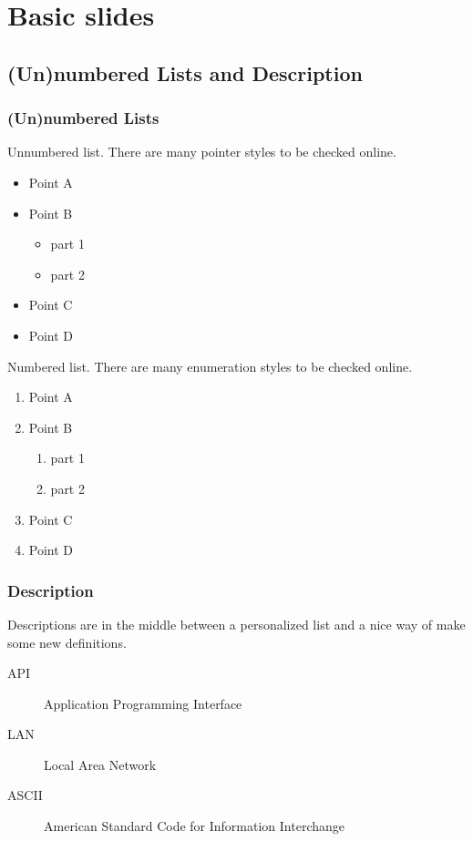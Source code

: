 \section{Basic slides}

\subsection{(Un)numbered Lists and Description}
\begin{frame}
    \frametitle{(Un)numbered Lists}
    Unnumbered list. There are many pointer styles to be checked online.
    \begin{itemize}
        \item Point A
        \item Point B
        \begin{itemize}
            \item part 1
            \item part 2
        \end{itemize}
        \item Point C
        \item Point D
    \end{itemize}
    Numbered list. There are many enumeration styles to be checked online.
    \begin{enumerate}[I]
        \item Point A
        \item Point B
        \begin{enumerate}[i]
            \item part 1
            \item part 2
        \end{enumerate}
        \item Point C
        \item Point D
    \end{enumerate}
\end{frame}

\begin{frame}
    \frametitle{Description}
    Descriptions are in the middle between a personalized list and a nice way of make some new definitions.
    \begin{description}
        \item[API] Application Programming Interface
        \item[LAN] Local Area Network
        \item[ASCII] American Standard Code for Information Interchange
    \end{description}
\end{frame}

